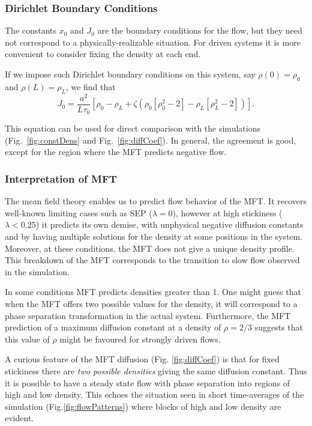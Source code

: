 \documentclass[
reprint, amsmath,amssymb,
]{revtex4-1}
\begin{document}
\subsubsection{Dirichlet Boundary Conditions}

The constants $x_0$ and $J_0$ are the boundary conditions for the
flow, but they need not correspond to a physically-realizable
situation.  For driven systems it is more convenient to consider fixing
the density at each end. 

If we impose such Dirichlet boundary conditions on this system, say
$\rho(0)=\rho_0$ and $\rho(L)=\rho_L$, we find that
\begin{equation}\label{eq:MFTflow}
 J_0 = \frac{a^2}{L \tau_0} \left[ \rho_0 - \rho_L + \zeta \left( \rho_0\left[\rho_0^2-2\right] - \rho_L\left[\rho_L^2-2\right] \right) \right].
\end{equation}

This equation can be used for direct comparison with the simulations
(Fig.~\ref{fig:constDens} and Fig.~\ref{fig:diffCoef}).  In general, the agreement is
good, except for the region where the MFT predicts negative flow.


\subsubsection{Interpretation of MFT}

The mean field theory enables us to predict flow behavior of the MFT.
It recovers well-known limiting cases such as SEP ($\lambda=0$),
however at high stickiness ($\lambda<0.25$) it predicts its own
demise, with unphysical negative diffusion constants and by having
multiple solutions for the density at some positions in the system.
Moreover, at these conditions, the MFT does not give a unique density
profile.  This breakdown of the MFT corresponds to the transition to
slow flow observed in the simulation.

In some
conditions MFT predicts densities greater than 1.  One might guess that when the
MFT offers two possible values for the density, it will correspond to
a phase separation transformation in the actual system. Furthermore,
the MFT prediction of a maximum diffusion constant at a density of
$\rho=2/3$ suggests that this value of $\rho$ might be favoured for
strongly driven flows.

A curious feature of the MFT diffusion (Fig. \ref{fig:diffCoef}) is
that for fixed stickiness there are {\it two possible densities}
giving the same diffusion constant.  Thus it is possible to have a
steady state flow with phase separation into regions of high and low
density. This echoes the situation seen in short time-averages of the
simulation (Fig.\ref{fig:flowPatterns}) where blocks of high and low
density are evident.
\end{document}
